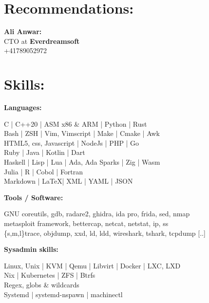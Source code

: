 \documentclass[a4paper,10pt]{article}
\begin{document}
\begin{adjustbox}{valign=t}
\begin{minipage}{0.6\textwidth}
\section*{Recommendations:}
\vspace{-0.2\baselineskip}
\begin{spacing}{0.8}
\begin{description}
	\item{\textbf{Ali Anwar:}}\\
		CTO at \textbf{Everdreamsoft}\\
		+41789052972
\end{description}

\vspace{-4.0\baselineskip}
\end{spacing}
\section*{Skills:}
\begin{description}
\begin{spacing}{0.85}
\item{\textbf{Languages:}}

    C | C++20 | ASM x86 \& ARM | Python | Rust \\
    Bash | ZSH | Vim, Vimscript | Make | Cmake | Awk\\
    HTML5, css, Javascript | NodeJs | PHP | Go\\
    Ruby | Java | Kotlin | Dart\\
    Haskell | Lisp | Lua | Ada, Ada Sparks | Zig | Wasm\\
    Julia | R | Cobol | Fortran \\
    Markdown | \LaTeX | XML | YAML | JSON

\item{\textbf{Tools / Software:}}

    GNU coreutils, gdb, radare2, ghidra, ida pro, frida, sed, nmap\\
    metasploit framework, bettercap, netcat, netstat, ip, ss\\
    \{s,m,l\}trace, objdump, xxd, ld, ldd, wireshark, tshark, tcpdump {[..]}

\item{\textbf{Sysadmin skills:}}

    Linux, Unix | KVM | Qemu | Libvirt | Docker | LXC, LXD\\
    Nix | Kubernetes | ZFS | Btrfs\\
    Regex, globs \& wildcards\\
    Systemd | systemd-nspawn | machinectl


\end{spacing}
\end{description}
\end{minipage}
\end{adjustbox}
\end{document}
